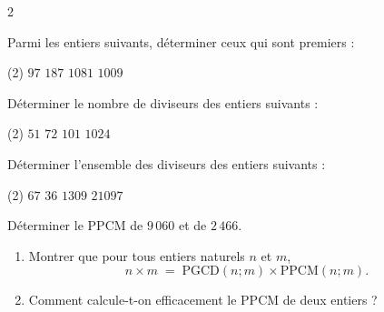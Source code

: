 \documentclass[a4paper,12pt]{article}
\title{
\centering
\tcbset{colframe=BlackSav,colback=GrayBG}
\tcbox[tikznode]{
  Chapitre 6 \\ Nombres premiers
}
}
\author{}
\date{}
\begin{document}
\maketitle

\begin{multicols}{2}

\begin{exercice}[title=Exercice 1 $\star$ { [Calculer] }]{}{}
  Parmi les entiers suivants, déterminer ceux qui sont premiers :
  \begin{tasks}[style=itemize](2)
    \task $97$
    \task $187$
    \task $1081$
    \task $1009$
  \end{tasks}
\end{exercice}

\begin{exercice}[title=Exercice 2 $\star$ { [Calculer] }]{}{}
  Déterminer le nombre de diviseurs des entiers suivants :
  \begin{tasks}[style=itemize](2)
    \task $51$
    \task $72$
    \task $101$
    \task $1024$
  \end{tasks}
\end{exercice}

\begin{exercice}[title=Exercice 3 $\star$ { [Calculer] }]{}{}
  Déterminer l'ensemble des diviseurs des entiers suivants :
  \begin{tasks}[style=itemize](2)
    \task $67$
    \task $36$
    \task $1309$
    \task $21097$
  \end{tasks}
\end{exercice}

\begin{exercice}[title=Exercice 4 $\star$ { [Calculer] }]{}{}
  Déterminer le $\mathrm{PPCM}$ de $9\,060$ et de $2\,466$.
\end{exercice}

\begin{exercice}[title=Exercice 5 $\star$ { [Calculer] }]{}{}
  \begin{enumerate}
    \item Montrer que pour tous entiers naturels $n$ et $m$,
      \[
        n \times m \;=\; \mathrm{PGCD}(n;m) \times \mathrm{PPCM}(n;m).
      \]
    \item Comment calcule-t-on efficacement le $\mathrm{PPCM}$ de deux entiers ?
  \end{enumerate}
\end{exercice}


\end{multicols}
\end{document}
